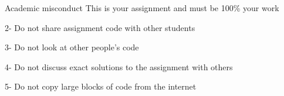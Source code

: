 \documentclass[week3]{csse1001}
\begin{document}

\begin{topic}{Academic misconduct}
This is your assignment and must be 100\% your work

\begin{subtopic}{2-}
Do not share assignment code with other students
\end{subtopic}

\begin{subtopic}{3-}
Do not look at other people's code
\end{subtopic}

\begin{subtopic}{4-}
Do not discuss exact solutions to the assignment with others
\end{subtopic}

\begin{subtopic}{5-}
Do not copy large blocks of code from the internet
\end{subtopic}

\end{topic}
\end{document}
